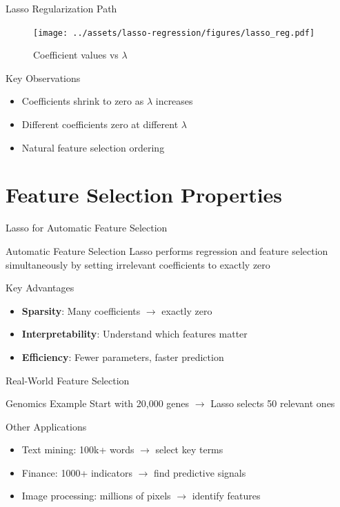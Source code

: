 \documentclass{beamer}
\begin{document}
\begin{frame}{Lasso Regularization Path}
\begin{figure}
    \centering
    \texttt{[image: ../assets/lasso-regression/figures/lasso\_reg.pdf]}
    \caption{{\footnotesize Coefficient values vs $\lambda$}}
    \label{fig:my_label}
\end{figure}

\begin{keypointsbox}{Key Observations}
{\small
\begin{itemize}
\item Coefficients shrink to zero as $\lambda$ increases
\item Different coefficients zero at different $\lambda$
\item Natural feature selection ordering
\end{itemize}
}
\end{keypointsbox}
\end{frame}


\section{Feature Selection Properties}

\begin{frame}{Lasso for Automatic Feature Selection}
\begin{definitionbox}{Automatic Feature Selection}
Lasso performs regression and feature selection simultaneously by setting irrelevant coefficients to exactly zero
\end{definitionbox}

\begin{keypointsbox}{Key Advantages}
{\small
\begin{itemize}
\item \textbf{Sparsity}: Many coefficients $\rightarrow$ exactly zero
\item \textbf{Interpretability}: Understand which features matter
\item \textbf{Efficiency}: Fewer parameters, faster prediction
\end{itemize}
}
\end{keypointsbox}
\end{frame}

\begin{frame}{Real-World Feature Selection}
\begin{examplebox}{Genomics Example}
Start with 20,000 genes $\rightarrow$ Lasso selects 50 relevant ones
\end{examplebox}

\begin{keypointsbox}{Other Applications}
{\small
\begin{itemize}
\item Text mining: 100k+ words $\rightarrow$ select key terms
\item Finance: 1000+ indicators $\rightarrow$ find predictive signals
\item Image processing: millions of pixels $\rightarrow$ identify features
\end{itemize}
}
\end{keypointsbox}
\end{frame}
\end{document}

